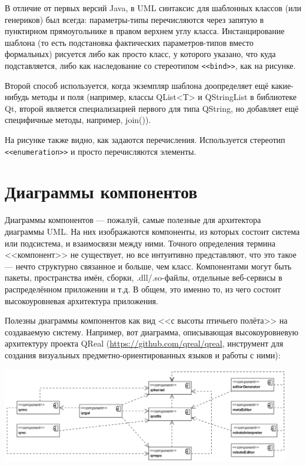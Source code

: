 \documentclass[a5paper]{article}
\begin{document}
В отличие от первых версий Java, в UML синтаксис для шаблонных классов (или генериков) был всегда: параметры-типы перечисляются через запятую в пунктирном прямоугольнике в правом верхнем углу класса. Инстанцирование шаблона (то есть подстановка фактических параметров-типов вместо формальных) рисуется либо как просто класс, у которого указано, что куда подставляется, либо как наследование со стереотипом \verb|<<bind>>|, как на рисунке.

Второй способ используется, когда экземпляр шаблона доопределяет ещё какие-нибудь методы и поля (например, классы QList<T> и QStringList в библиотеке Qt, второй является специализацией первого для типа QString, но добавляет ещё специфичные методы, например, join()).

На рисунке также видно, как задаются перечисления. Используется стереотип \verb|<<enumeration>>| и просто перечисляются элементы.

\section{Диаграммы компонентов}

Диаграммы компонентов --- пожалуй, самые полезные для архитектора диаграммы UML. На них изображаются компоненты, из которых состоит система или подсистема, и взаимосвязи между ними. Точного определения термина <<компонент>> не существует, но все интуитивно представляют, что это такое --- нечто структурно связанное и больше, чем класс. Компонентами могут быть пакеты, пространства имён, сборки, .dll/.so-файлы, отдельные веб-сервисы в распределённом приложении и т.д. В общем, это именно то, из чего состоит высокоуровневая архитектура приложения.

Полезны диаграммы компонентов как вид <<с высоты птичьего полёта>> на создаваемую систему. Например, вот диаграмма, описывающая высокоуровневую архитектуру проекта QReal (\url{https://github.com/qreal/qreal}, инструмент для создания визуальных предметно-ориентированных языков и работы с ними):

\begin{center}
    \includegraphics[width=0.95\textwidth]{componentDiagrams.png}
\end{center}
\end{document}

